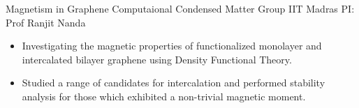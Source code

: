 
        {Magnetism in Graphene}
        {\newline Computaional Condensed Matter Group}
        {IIT Madras}
        {PI: Prof Ranjit Nanda}{
    \begin{itemize}
        \item Investigating the magnetic properties of functionalized monolayer and intercalated bilayer graphene using Density Functional Theory.
        \item Studied a range of candidates for intercalation and performed stability analysis for those which exhibited a non-trivial magnetic moment. 
    \end{itemize}
}
